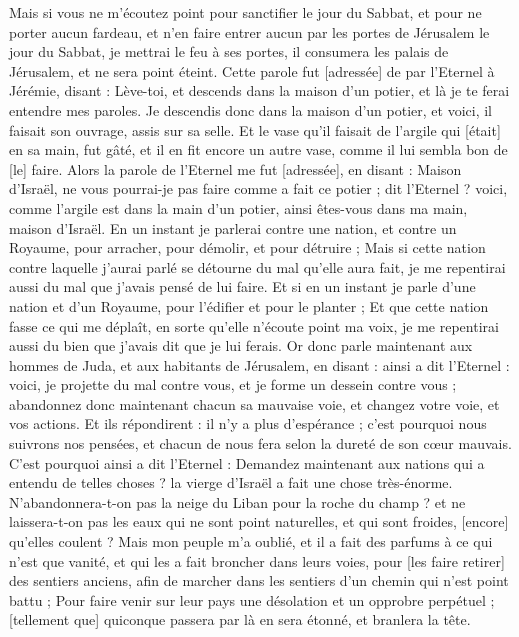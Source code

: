 \begin{multicols}{2}
Mais si vous ne m'écoutez point pour sanctifier le jour du Sabbat, et pour ne porter aucun fardeau, et n'en faire entrer aucun par les portes de Jérusalem le jour du Sabbat, je mettrai le feu à ses portes, il consumera les palais de Jérusalem, et ne sera point éteint.
\VerseOne{}Cette parole fut [adressée] de par l'Eternel à Jérémie, disant :
Lève-toi, et descends dans la maison d'un potier, et là je te ferai entendre mes paroles.
Je descendis donc dans la maison d'un potier, et voici, il faisait son ouvrage, assis sur sa selle.
Et le vase qu'il faisait de l'argile qui [était] en sa main, fut gâté, et il en fit encore un autre vase, comme il lui sembla bon de [le] faire.
Alors la parole de l'Eternel me fut [adressée], en disant :
Maison d'Israël, ne vous pourrai-je pas faire comme a fait ce potier ; dit l'Eternel ? voici, comme l'argile est dans la main d'un potier, ainsi êtes-vous dans ma main, maison d'Israël.
En un instant je parlerai contre une nation, et contre un Royaume, pour arracher, pour démolir, et pour détruire ;
Mais si cette nation contre laquelle j'aurai parlé se détourne du mal qu'elle aura fait, je me repentirai aussi du mal que j'avais pensé de lui faire.
Et si en un instant je parle d'une nation et d'un Royaume, pour l'édifier et pour le planter ;
Et que cette nation fasse ce qui me déplaît, en sorte qu'elle n'écoute point ma voix, je me repentirai aussi du bien que j'avais dit que je lui ferais.
Or donc parle maintenant aux hommes de Juda, et aux habitants de Jérusalem, en disant : ainsi a dit l'Eternel : voici, je projette du mal contre vous, et je forme un dessein contre vous ; abandonnez donc maintenant chacun sa mauvaise voie, et changez votre voie, et vos actions.
Et ils répondirent : il n'y a plus d'espérance ; c'est pourquoi nous suivrons nos pensées, et chacun de nous fera selon la dureté de son cœur mauvais.
C'est pourquoi ainsi a dit l'Eternel : Demandez maintenant aux nations qui a entendu de telles choses ? la vierge d'Israël a fait une chose très-énorme.
N'abandonnera-t-on pas la neige du Liban pour la roche du champ ? et ne laissera-t-on pas les eaux qui ne sont point naturelles, et qui sont froides, [encore] qu'elles coulent ?
Mais mon peuple m'a oublié, et il a fait des parfums à ce qui n'est que vanité, et qui les a fait broncher dans leurs voies, pour [les faire retirer] des sentiers anciens, afin de marcher dans les sentiers d'un chemin qui n'est point battu ;
Pour faire venir sur leur pays une désolation et un opprobre perpétuel ; [tellement que] quiconque passera par là en sera étonné, et branlera la tête.

\end{multicols}
